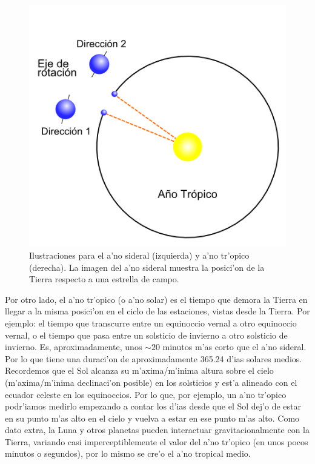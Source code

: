 \documentclass{article}
\begin{document}
\begin{enumerate} [a)]
\begin{figure}[!h]
\begin{minipage}[b]{0.4\textwidth}
    \includegraphics[width=\textwidth]{ano_tropico.png}
  \end{minipage}
  \caption{Ilustraciones para el a'no sideral (izquierda) y a'no tr'opico (derecha). La imagen del a'no sideral muestra la posici'on de la Tierra respecto a una estrella de campo.} \label{anos}
\end{figure}

Por otro lado, el a'no tr'opico (o a'no solar) es el tiempo que demora la Tierra en llegar a la misma posici'on en el ciclo de las estaciones, vistas desde la Tierra. Por ejemplo: el tiempo que transcurre entre un equinoccio vernal a otro equinoccio vernal, o el tiempo que pasa entre un solsticio de invierno a otro solsticio de invierno. Es, aproximadamente, unos  $\sim20$ minutos m'as corto que el a'no sideral. Por lo que tiene una duraci'on de aproximadamente 365.24 d'ias solares medios. 
Recordemos que el Sol alcanza su m'axima/m'inima altura sobre el cielo (m'axima/m'inima declinaci'on posible) en los solsticios y est'a alineado con el ecuador celeste en los equinoccios. Por lo que, por ejemplo, un a'no tr'opico podr'iamos medirlo empezando a contar los d'ias desde que el Sol dej'o de estar en su punto m'as alto en el cielo y vuelva a estar en ese punto m'as alto. Como dato extra, la Luna y otros planetas pueden interactuar gravitacionalmente con la Tierra, variando casi imperceptiblemente el valor del a'no tr'opico (en unos pocos minutos o segundos), por lo mismo se cre'o el a'no tropical medio.


\end{enumerate}
\end{document}
